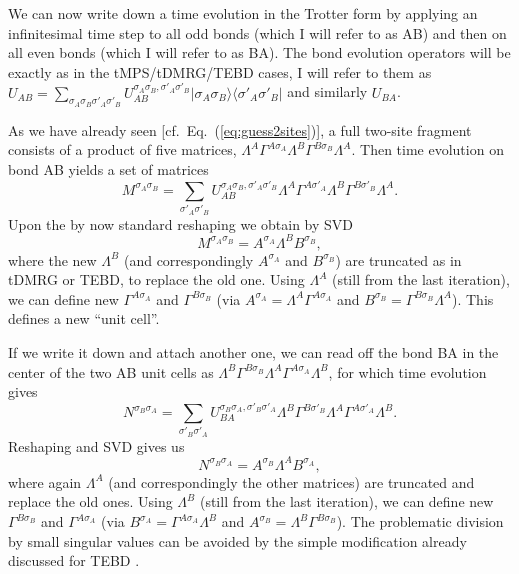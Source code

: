 \documentclass[a4paper,10pt,oneside,onecolumn,1p,times]{elsarticle}
\newcommand{\bra}[1]{\mbox{$\langle #1  |$}}
\newcommand{\ket}[1]{\mbox{$| #1  \rangle$}}
\begin{document}
We can now write down a time evolution in the Trotter form by applying an infinitesimal time step to all odd bonds (which I will refer to as AB) and then on all even bonds (which I will refer to as BA). The bond evolution operators will be exactly as in the tMPS/tDMRG/TEBD cases, I will refer to them as $U_{AB} = \sum_{\sigma_A\sigma_B\sigma'_A\sigma'_B} U_{AB}^ {\sigma_A\sigma_B, \sigma'_A\sigma'_B} \ket{\sigma_A\sigma_B} \bra{\sigma'_A\sigma'_B}$ and similarly $U_{BA}$.

As we have already seen [cf.\ Eq.~(\ref{eq:guess2sites})], a full two-site fragment consists of a product of five matrices, 
$\Lambda^A \Gamma^{A \sigma_A} \Lambda^B \Gamma^{B \sigma_{B}} \Lambda^A$. Then time evolution on bond AB yields a set of matrices
\begin{equation}
M^{\sigma_A\sigma_{B}} = \sum_{\sigma'_A\sigma'_{B}} U_{AB}^ {\sigma_A\sigma_{B}, \sigma'_A\sigma'_{B}}  \Lambda^A \Gamma^{A \sigma'_A} \Lambda^B \Gamma^{B \sigma'_{B}} \Lambda^A .
\end{equation}
Upon the by now standard reshaping we obtain by SVD 
\begin{equation}
M^{\sigma_A\sigma_{B}}=A^{\sigma_A} \Lambda^B B^{\sigma_{B}} ,
\end{equation}
where the new $\Lambda^B$ (and correspondingly $A^{\sigma_A}$ and $B^{\sigma_{B}}$) are truncated as in tDMRG or TEBD, to replace the old one. Using $\Lambda^A$ (still from the last iteration), we can define new $\Gamma^{A \sigma_A}$ and $\Gamma^{B \sigma_{B}} $ (via $A^{\sigma_A} = \Lambda^A \Gamma^{A \sigma_A}$ and
$B^{\sigma_{B}} = \Gamma^{B \sigma_{B}} \Lambda^A$). This defines a new ``unit cell''. 

If we write it down and attach another one, we can read off the bond BA in the center of the two AB unit cells as
$ \Lambda^B \Gamma^{B \sigma_{B}} \Lambda^A \Gamma^{A \sigma_{A}} \Lambda^B$, for which time evolution gives
\begin{equation}
N^{\sigma_{B}\sigma_{A}} = \sum_{\sigma'_{B}\sigma'_{A}} U_{BA}^ {\sigma_{B}\sigma_{A}, \sigma'_{B}\sigma'_{A}}  \Lambda^B \Gamma^{B \sigma'_{B}} \Lambda^A \Gamma^{A \sigma'_{A}} \Lambda^B .
\end{equation}
Reshaping and SVD gives us
\begin{equation}
N^{\sigma_{B}\sigma_{A}}=A^{\sigma_{B}} \Lambda^A B^{\sigma_{A}} ,
\end{equation}
where again $\Lambda^A$ (and correspondingly the other matrices) are truncated and replace the old ones. Using $\Lambda^B$ (still from the last iteration), we can define new $\Gamma^{B \sigma_{B}}$ and $\Gamma^{A \sigma_{A}} $ (via $B^{\sigma_{A}} =   \Gamma^{A \sigma_{A}} \Lambda^B$ and $A^{\sigma_{B}} =\Lambda^B \Gamma^{B \sigma_{B}}$). The problematic division by small singular values can be avoided by the simple modification already discussed for TEBD \cite{Hastings09}.
\end{document}
